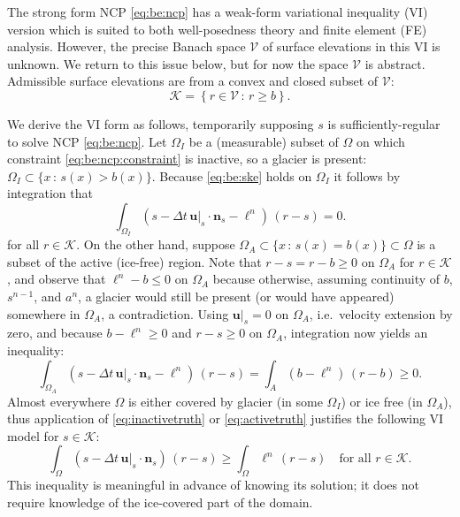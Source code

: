 \documentclass[hidelinks,onefignum,onetabnum,final]{siamart220329}  %
\newcommand{\bn}{\mathbf{n}}
\newcommand{\bu}{\mathbf{u}}
\newcommand{\cK}{\mathcal{K}}
\newcommand{\cV}{\mathcal{V}}
\begin{document}
The strong form NCP \eqref{eq:be:ncp} has a weak-form variational inequality (VI) version which is suited to both well-posedness theory and finite element (FE) analysis.  However, the precise Banach space $\cV$ of surface elevations in this VI is unknown.  We return to this issue below, but for now the space $\cV$ is abstract.  Admissible surface elevations are from a convex and closed subset of $\cV$:
\begin{equation}
\cK = \left\{r \in\cV\,:\,r \ge b\right\}.  \label{eq:be:admissible}
\end{equation}

We derive the VI form \cite{Bueler2021conservation} as follows, temporarily supposing $s$ is sufficiently-regular to solve NCP \eqref{eq:be:ncp}.  Let $\Omega_I$ be a (measurable) subset of $\Omega$ on which constraint \eqref{eq:be:ncp:constraint} is inactive, so a glacier is present: $\Omega_I \subset \{x\,:\,s(x)>b(x)\}$.  Because \eqref{eq:be:ske} holds on $\Omega_I$ it follows by integration that
\begin{equation}
\int_{\Omega_I} \left(s - \Delta t\,\bu|_s \cdot \bn_s - \ell^n\right)\,(r-s) = 0.  \label{eq:inactivetruth}
\end{equation}
for all $r\in\cK$.  On the other hand, suppose $\Omega_A \subset \{x\,:\,s(x)=b(x)\} \subset \Omega$ is a subset of the active (ice-free) region.  Note that $r-s=r-b\ge 0$ on $\Omega_A$ for $r\in\cK$, and observe that $\ell^n - b \le 0$ on $\Omega_A$ because otherwise, assuming continuity of $b$, $s^{n-1}$, and $a^n$, a glacier would still be present (or would have appeared) somewhere in $\Omega_A$, a contradiction.  Using $\bu|_s=0$ on $\Omega_A$, i.e.~velocity extension by zero, and because $b-\ell^n \ge 0$ and $r-s\ge 0$ on $\Omega_A$, integration now yields an inequality:
\begin{equation}
\int_{\Omega_A} \left(s - \Delta t\,\bu|_s \cdot \bn_s - \ell^n\right)\,(r-s) = \int_A \left(b - \ell^n\right)\,(r-b) \ge 0.  \label{eq:activetruth}
\end{equation}
Almost everywhere $\Omega$ is either covered by glacier (in some $\Omega_I$) or ice free (in $\Omega_A$), thus application of \eqref{eq:inactivetruth} or \eqref{eq:activetruth} justifies the following VI model for $s \in \cK$:
\begin{equation}
\int_\Omega \left(s - \Delta t\,\bu|_s \cdot \bn_s\right)\,(r-s) \ge \int_\Omega \ell^n \,(r-s) \quad \text{for all } r \in \cK. \label{eq:be:viearly}
\end{equation}
This inequality is meaningful in advance of knowing its solution; it does not require knowledge of the ice-covered part of the domain.
	
\end{document}
